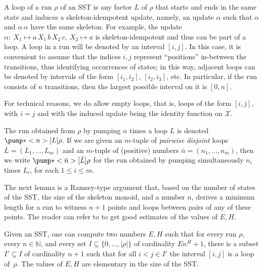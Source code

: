 \documentclass{article}
\providecommand{\AP}{}\NewDocumentCommand{\reintro}{o m}{#2}
\newcommand{\var}{\mathcal{X}}
\begin{document}
\AP
A loop of a run $\rho$ of an SST 
is any factor $L$ of $\rho$ 
that starts and ends in the same state and 
induces a skeleton-idempotent update,
namely, an update $\alpha$ such that $\alpha$ and $\alpha\,\alpha$
have the same skeleton. 
For example, the update 
$\alpha: \: X_1\mapsto a \, X_1 \, b \, X_2 \, c, \:  X_2\mapsto a$
is skeleton-idempotent and thus can be part of a loop.
A loop in a run will be denoted by an interval $[i,j]$.
In this case, it is convenient to assume that the indices $i,j$ represent
``positions'' in-between the transitions, thus identifying occurrences of 
states; in this way, adjacent loops can be denoted by intervals of 
the form $[i_1,i_2]$, $[i_2,i_3]$, etc.
In particular, if the run consists of $n$ transitions, then 
the largest possible interval on it is $[0,n]$.
\AP
For technical reasons, we do allow empty loops,
that is, loops of the form $[i,j]$, with $i=j$ and with 
the induced update being the identity function on $\var$.

\AP
The run obtained from $\rho$ by pumping $n$ times a loop $L$ 
is denoted $\pump*<n>[L]{\rho}$.
If we are given an $m$-tuple of \emph{pairwise disjoint} loops
$\bar{L}=(L_1,\dots,L_m)$ and an $m$-tuple of (positive) numbers 
$\bar{n}=(n_1,\dots,n_m)$, then we write
$\reintro[pumping]{\pump*<\bar n>[\bar L]{\rho}}$ 
for the run obtained by pumping simultaneously $n_i$ times
$L_i$, for each $1 \le i \le m$. 


The next lemma is a Ramsey-type argument that,
based on the number of states of the SST, the size of the 
skeleton monoid, and a number $n$,
derives a minimum length for a run to witness $n+1$ points
and loops between pairs of any of these points. 
The reader can refer to \cite{JeckerSTACS21}
to get good estimates of the values of $E,H$.


\begin{lemma}\label{lem:ramsey}
Given an SST, one can compute two numbers $E,H$ such that
for every run $\rho$, every $n\in\mathbb{N}$, and every set
$I \subseteq \{0,\dots,|\rho|\}$ of cardinality $E n^H+1$, 
there is a subset $I'\subseteq I$ of cardinality $n + 1$
such that for all $i < j \in I'$ the interval
$[i,j]$ is a loop of~$\rho$.
The values of $E,H$ are elementary in the size of the SST.
\end{lemma}
\end{document}
